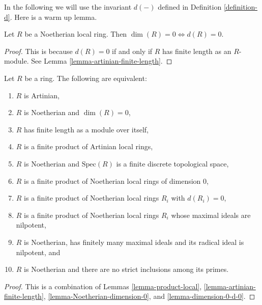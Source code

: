 \noindent
In the following we will use the invariant $d(-)$ defined
in Definition \ref{definition-d}. Here is a warm up lemma.

\begin{lemma}
\label{lemma-dimension-0-d-0}
Let $R$ be a Noetherian local ring.
Then $\dim(R) = 0 \Leftrightarrow d(R) = 0$.
\end{lemma}

\begin{proof}
This is because $d(R) = 0$ if and only if $R$ has finite
length as an $R$-module. See Lemma \ref{lemma-artinian-finite-length}.
\end{proof}

\begin{proposition}
\label{proposition-dimension-zero-ring}
Let $R$ be a ring. The following are equivalent:
\begin{enumerate}
\item $R$ is Artinian,
\item $R$ is Noetherian and $\dim(R) = 0$,
\item $R$ has finite length as a module over itself,
\item $R$ is a finite product of Artinian local rings,
\item $R$ is Noetherian and $\text{Spec}(R)$ is a
finite discrete topological space,
\item $R$ is a finite product of Noetherian local rings
of dimension $0$,
\item $R$ is a finite product of Noetherian local rings
$R_i$ with $d(R_i) = 0$,
\item $R$ is a finite product of Noetherian local rings
$R_i$ whose maximal ideals are nilpotent,
\item $R$ is Noetherian, has finitely many maximal
ideals and its radical ideal is nilpotent, and
\item $R$ is Noetherian and there are no strict inclusions
among its primes.
\end{enumerate}
\end{proposition}

\begin{proof}
This is a combination of Lemmas
\ref{lemma-product-local},
\ref{lemma-artinian-finite-length},
\ref{lemma-Noetherian-dimension-0}, and
\ref{lemma-dimension-0-d-0}.
\end{proof}

